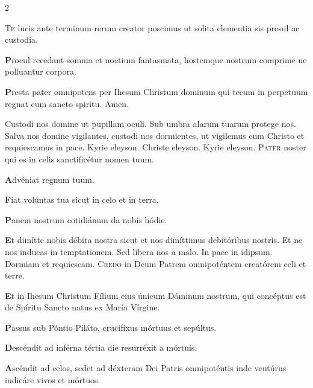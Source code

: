 \begin{multicols}{2}
{\lettrine[lines=2]{\zallmancaps \color{Red} T}{e} lucis ante terminum
rerum creator poscimus
ut solita clementia
sis presul ac custodia.
\par {\bfseries \color{Blue} P}rocul recedant somnia
et noctium fantasmata,
hostemque nostrum comprime
ne polluantur corpora.
\par {\bfseries \color{Red} P}resta pater omnipotens
per Ihesum Christum dominum
qui tecum in perpetuum
regnat cum sancto spiritu. Amen.
}
\newline \V Custodi nos domine ut pupillam oculi. \R Sub umbra alarum tuarum protege nos.
\newline {} Salva nos domine vigilantes, custodi nos dormientes, ut vigilemus cum Christo et requiescamus in pace. 
\newline Kyrie eleyson. Christe eleyson. Kyrie eleyson. 
\lettrine[lines=2]{\zallmancaps \color{Red} P}{ater} noster qui es in celis sanctificétur nomen tuum.
\begingroup
\setlength{\parindent}{.25em}
\par {\bfseries \color{Blue} A}dvéniat regnum tuum.
\par {\bfseries \color{Red} F}iat volúntas tua sicut in celo et in terra.
\par {\bfseries \color{Blue} P}anem nostrum cotidiánum da nobis hódie.
\par {\bfseries \color{Red} E}t dimítte nobis débita nostra sicut et nos dimíttimus debitóribus nostris.
\aftergroup\clearparshape%
\endgroup
\newline {} Et ne nos inducas in temptationem. \R Sed libera nos a malo.
\newline \V In pace in idipsum. \R Dormiam et requiescam.
\newline {}
\lettrine[lines=2]{\zallmancaps \color{Blue} C}{redo} in Deum Patrem omnipoténtem creatórem celi et terre.
\begingroup
\setlength{\parindent}{.25em}
\par {\bfseries \color{Red} E}t in Ihesum Christum Fílium eius únicum Dóminum nostrum, qui concéptus est de Spíritu Sancto natus ex María Vírgine.
\par {\bfseries \color{Blue} P}assus sub Póntio Piláto, crucifíxus mórtuus et sepúltus.
\par {\bfseries \color{Red} D}escéndit ad inférna tértia die resurréxit a mórtuis.
\par {\bfseries \color{Blue} A}scéndit ad celos, sedet ad déxteram Dei Patris omnipoténtis inde ventúrus iudicáre vivos et mórtuos.

\end{multicols}
